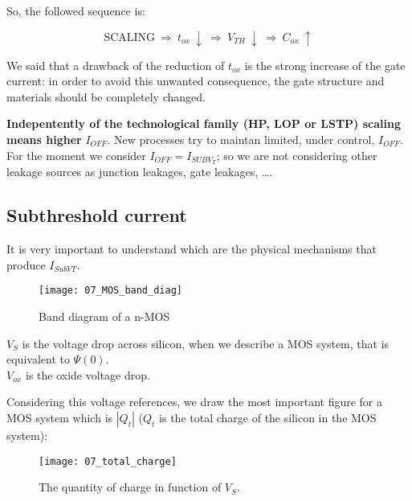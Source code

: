 \documentclass[a4paper, 12pt, twoside, openright]{report}
\begin{document}
So, the followed sequence is:

\begin{equation}
\text{SCALING} \ \Rightarrow \ t_{ox} \ \downarrow \ \Rightarrow \ V_{TH} \ \downarrow \ \Rightarrow \ C_{ox} \ \uparrow
\end{equation}

We said that a drawback of the reduction of $t_{ox}$ is the strong increase of the gate current: in order to avoid this unwanted consequence, the gate structure and materials should be completely changed.

\textbf{Indepentently of the technological family (HP, LOP or LSTP) scaling means higher} $I_{OFF}$. New processes try to maintan limited, under control, $I_{OFF}$. For the moment we consider $I_{OFF} = I_{SUBV_{T}}$; so we are not considering other leakage sources as junction leakages, gate leakages, \dots.

\subsection{Subthreshold current}

It is very important to understand which are the physical mechanisms that produce $I_{SubVT}$.

	\begin{figure}[H]
	\centering
	\texttt{[image: 07\_MOS\_band\_diag]}
	\caption{Band diagram of a n-MOS}
	\label{}
	\end{figure}

$V_{S}$ is the voltage drop across silicon, when we describe a MOS system, that is equivalent to $\Psi(0)$.\\
$V_{ox}$ is the oxide voltage drop.

Considering this voltage references, we draw the most important figure for a MOS system which is $|Q_t|$ ($Q_{t}$ is the total charge of the silicon in the MOS system):

	\begin{figure}[H]
	\centering
	\texttt{[image: 07\_total\_charge]}
	\caption{The quantity of charge in function of $V_{S}$.}
	\label{}
	\end{figure}
\end{document}
